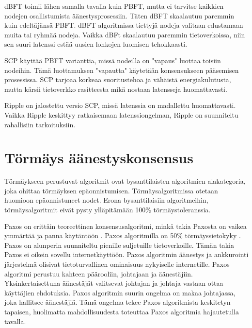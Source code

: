\documentclass[utf8,bachelor]{gradu3}
\begin{document}
dBFT toimii lähen samalla tavalla kuin PBFT, mutta ei tarvitse kaikkien nodejen osallistumista äänestysprosessiin. Täten dBFT skaalautuu paremmin kuin edeltäjänsä PBFT.
dBFT algoritmissa tiettyjä nodeja valitaan edustamaan muita tai ryhmää nodeja.
Vaikka dBFt skaalautuu paremmin tietoverkoissa, niin sen suuri latenssi estää uusien lohkojen luomisen tehokkaasti.

SCP käyttää PBFT varianttia, missä nodeilla on "vapaus" luottaa toisiin nodeihin. Tämä luottamuksen "vapautta" käytetään konsensukseen pääsemisen prosessissa.
SCP tarjoaa korkeaa suoritustehoa ja vähäistä energiakulutusta, mutta kärsii tietoverkko rasitteesta mikä nostaaa latensseja huomattavasti. 

Ripple on jalostettu versio SCP, missä latenssia on madallettu huomattavasti. Vaikka Ripple keskittyy ratkaisemaan latenssiongelman, Ripple on suunniteltu rahallisiin tarkoituksiin.

\section{Törmäys äänestyskonsensus}

Törmäykseen perustuvat algoritmit ovat bysanttilaisten algoritmien alakategoria, joka ohittaa törmäyksen epäonnistumisen. Törmäysalgoritmissa otetaan huomioon epäonnistuneet nodet. Erona bysanttilaisiin algoritmeihin, törmäysalgoritmit eivät pysty ylläpitämään 100\% törmäystoleranssia.

Paxos on erittäin teoreettinen konsensusalgoritmi, minkä takia Paxosta on vaikea ymmärtää ja panna käytäntöön \parencite{andrey2019review}.
Paxos algoritmilla on 50\% törmäyssietokyky \parencite{panda2019study}.
Paxos on alunperin suunniteltu pienille suljetuille tietoverkoille. Tämän takia Paxos ei oikein sovellu internetkäyttöön.
Paxos algoritmin äänestys ja ankkurointi järjestelmä olisivat tietoturvallinen ominaisuus nykyiselle internetille. 
Paxos algoritmi perustuu kahteen päärooliin, johtajaan ja äänestäjiin. Yksinkertaisettuna äänestäjät valitsevat johtajan ja johtaja vastaan ottaa käyttäjien ehdotuksia.
Paxos algoritmin suurin ongelma on makaa johtajassa, joka hallitsee äänestäjiä. Tämä ongelma tekee Paxos algoritmista keskitetyn tapaisen, huolimatta mahdollisuudesta toteuttaa Paxos algoritmia hajautetulla tavalla.
\end{document}
